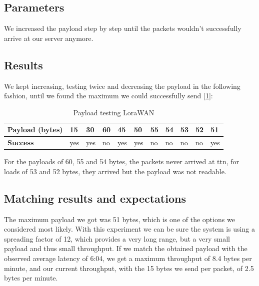 	\subsection*{Parameters}
		We increased the payload step by step until the packets wouldn't successfully arrive at our server anymore.
	\subsection*{Results}
		We kept increasing, testing twice and decreasing the payload in the following fashion, until we found the maximum we could successfully send [\ref{tab:LoraWanPayload}]:

		\begin{table}[h]
			\begin{tabular}{@{}l|llllllllll@{}}
				\textbf{Payload (bytes)} & 15  & 30  & 60 & 45  & 50  & 55 & 54 & 53 & 52 & 51  \\\hline
				\textbf{Success} & yes & yes & no & yes & yes & no & no & no & no & yes
			\end{tabular}
			\caption[Payload testing LoraWAN]{Payload testing LoraWAN}
			\label{tab:LoraWanPayload}
		\end{table}

		For the payloads of 60, 55 and 54 bytes, the packets never arrived at ttn, for loads of 53 and 52 bytes, they arrived but the payload was not readable.

	\subsection*{Matching results and expectations}
		The maximum payload we got was 51 bytes, which is one of the options we considered most likely. With this experiment we can be sure the system is using a spreading factor of 12, which provides a very long range, but a very small payload and thus small throughput. If we match the obtained payload with the observed average latency of 6:04, we get a maximum throughput of 8.4 bytes per minute, and our current throughput, with the 15 bytes we send per packet, of 2.5 bytes per minute.

